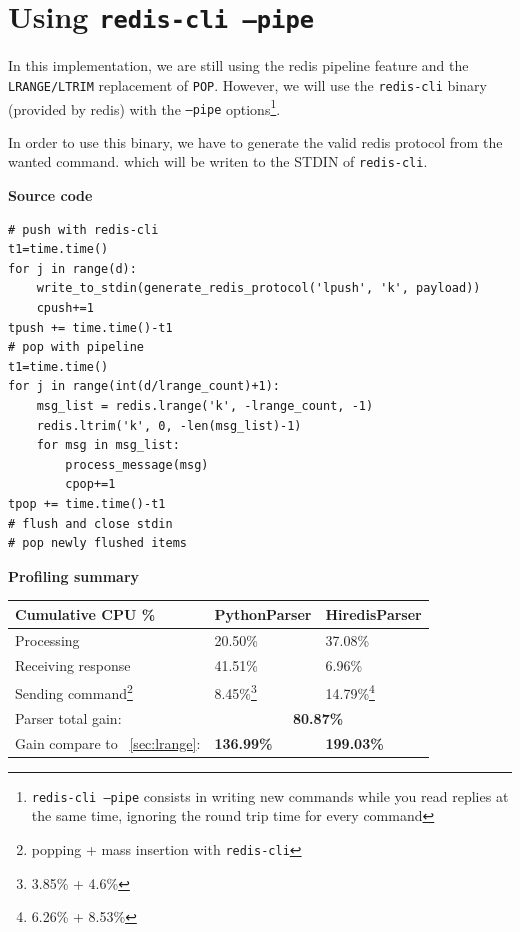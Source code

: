 \documentclass[a4paper, 11pt]{report}
\newcommand{\inlinecode}[1]{\colorbox{mybeige}{\ttfamily\texttt{#1}}}
\begin{document}
\newpage
\section{Using \texttt{redis-cli --pipe}\label{sec:cli}}
In this implementation, we are still using the redis pipeline feature and the \texttt{LRANGE/LTRIM} replacement of \texttt{POP}. However, we will use the \texttt{redis-cli} binary (provided by redis) with the \inlinecode{--pipe} options\footnote{\texttt{redis-cli --pipe} consists in writing new commands while you read replies at the same time, ignoring the round trip time for every command}.

In order to use this binary, we have to generate the valid redis protocol from the wanted command. which will be writen to the STDIN of \texttt{redis-cli}.\\

\begin{minipage}[t]{0.45\textwidth}
\textbf{Source code}\\
\vspace{-0.5em}
\begin{lstlisting}
# push with redis-cli
t1=time.time()
for j in range(d):
    write_to_stdin(generate_redis_protocol('lpush', 'k', payload))
    cpush+=1
tpush += time.time()-t1
# pop with pipeline
t1=time.time()
for j in range(int(d/lrange_count)+1):
    msg_list = redis.lrange('k', -lrange_count, -1)
    redis.ltrim('k', 0, -len(msg_list)-1)
    for msg in msg_list:
        process_message(msg)
        cpop+=1
tpop += time.time()-t1
# flush and close stdin
# pop newly flushed items
\end{lstlisting}
\end{minipage}
\quad
\begin{minipage}[t]{0.5\textwidth}
\textbf{Profiling summary}\\

    \begin{tabular}{|l|l|l|}
        \hline
        Cumulative CPU \% & PythonParser & HiredisParser\\
        \hline
        Processing & 20.50\% & 37.08\%\\
        \hline
        Receiving response & 41.51\% & 6.96\%\\
        \hline
        Sending command\footnote{popping + mass insertion with \texttt{redis-cli}} & 8.45\%\footnote{3.85\% + 4.6\%} & 14.79\%\footnote{6.26\% + 8.53\%} \\
        \hline
        Parser total gain: & \multicolumn{2}{c|}{\textbf{80.87\%}}\\
        \hline
        Gain compare to ~\ref{sec:lrange}: & \textbf{136.99\%} & \textbf{199.03\%}\\
        \hline
    \end{tabular}
\end{minipage}
\end{document}
